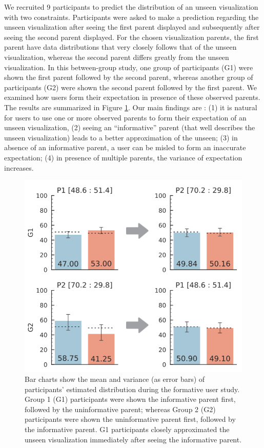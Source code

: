 We recruited 9 participants to predict the distribution of an unseen visualization with two constraints. Participants were asked to make a prediction regarding the unseen visualization after seeing the first parent displayed and subsequently after seeing the second parent displayed. For the chosen visualization parents, the first parent have data distributions that very closely follows that of the unseen visualization, whereas the second parent differs greatly from the unseen visualization. In this between-group study, one group of participants (G1) were shown the first parent followed by the second parent, whereas another group of participants (G2) were shown the second parent followed by the first parent. We examined how users form their expectation in presence of these observed parents. The results are summarized in Figure \ref{fig:formative_study}. Our main findings are : (1) it is natural for users to use one or more observed parents to form their expectation of an unseen visualization, (2) seeing an ``informative'' parent (that well describes the unseen visualization) leads to a better approximation of the unseen; (3) in absence of an informative parent, a user can be misled to form an inaccurate expectation; (4) in presence of multiple parents, the variance of expectation increases.
\begin{figure}[bht]
\centering
\includegraphics[width=\linewidth]{figures/Formative_Study.png}
\caption{Bar charts show the mean and variance (as error bars) of participants' estimated distribution during the formative user study. Group 1 (G1) participants were shown the informative parent first, followed by the uninformative parent; whereas Group 2 (G2) participants were shown the uninformative parent first, followed by the informative parent. G1 participants closely approximated the unseen visualization immediately after seeing the informative parent.}
\label{fig:formative_study}
\end{figure}

